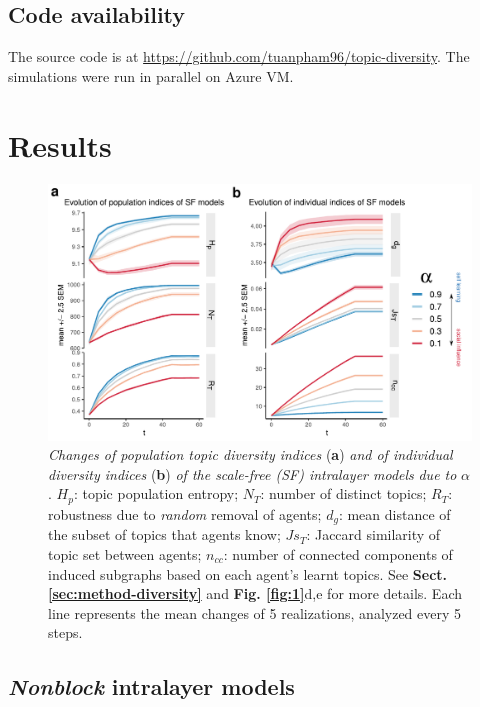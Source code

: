 \documentclass{svproc}
\begin{document}
\subsection{Code availability}

The source code is at \url{https://github.com/tuanpham96/topic-diversity}. The simulations were run in parallel on Azure VM.

\section{Results}

\begin{figure}[!ht]
    \centering
    \includegraphics[width=\textwidth]{Fig2.pdf}
    \caption{
    \textit{Changes of population topic diversity indices} (\textbf{a}) \textit{and of individual diversity indices} (\textbf{b}) \textit{of the scale-free (SF) intralayer models} \textit{due to} $\alpha$. $H_p$: topic population entropy; $N_T$: number of distinct topics; $R_T$: robustness due to \textit{random} removal of agents; $d_g$: mean distance of the subset of topics that agents know; $Js_T$: Jaccard similarity of topic set between agents; $n_{cc}$: number of connected components of induced subgraphs based on each agent's learnt topics. See \textbf{Sect. \ref{sec:method-diversity}} and \textbf{Fig. \ref{fig:1}}d,e for more details. Each line represents the mean changes of 5 realizations, analyzed every 5 steps.
    }
    \label{fig:2}
\end{figure}

\subsection{\textit{Nonblock} intralayer models} \label{results-nonblock}
\end{document}

